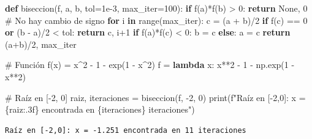 \documentclass[
  english,
  letterpaper,
  DIV=11,
  numbers=noendperiod]{scrartcl}
\newenvironment{Shaded}{\begin{snugshade}}{\end{snugshade}}
\newcommand{\BuiltInTok}[1]{\textcolor[rgb]{0.00,0.23,0.31}{#1}}
\newcommand{\CommentTok}[1]{\textcolor[rgb]{0.37,0.37,0.37}{#1}}
\newcommand{\ControlFlowTok}[1]{\textcolor[rgb]{0.00,0.23,0.31}{\textbf{#1}}}
\newcommand{\DecValTok}[1]{\textcolor[rgb]{0.68,0.00,0.00}{#1}}
\newcommand{\FloatTok}[1]{\textcolor[rgb]{0.68,0.00,0.00}{#1}}
\newcommand{\KeywordTok}[1]{\textcolor[rgb]{0.00,0.23,0.31}{\textbf{#1}}}
\newcommand{\NormalTok}[1]{\textcolor[rgb]{0.00,0.23,0.31}{#1}}
\newcommand{\OperatorTok}[1]{\textcolor[rgb]{0.37,0.37,0.37}{#1}}
\newcommand{\SpecialCharTok}[1]{\textcolor[rgb]{0.37,0.37,0.37}{#1}}
\newcommand{\SpecialStringTok}[1]{\textcolor[rgb]{0.13,0.47,0.30}{#1}}
\newcommand{\VariableTok}[1]{\textcolor[rgb]{0.07,0.07,0.07}{#1}}
\begin{document}
\begin{Shaded}
\begin{Highlighting}[]
\KeywordTok{def}\NormalTok{ biseccion(f, a, b, tol}\OperatorTok{=}\FloatTok{1e{-}3}\NormalTok{, max\_iter}\OperatorTok{=}\DecValTok{100}\NormalTok{):}
    \ControlFlowTok{if}\NormalTok{ f(a)}\OperatorTok{*}\NormalTok{f(b) }\OperatorTok{\textgreater{}} \DecValTok{0}\NormalTok{:}
        \ControlFlowTok{return} \VariableTok{None}\NormalTok{, }\DecValTok{0}  \CommentTok{\# No hay cambio de signo}
    \ControlFlowTok{for}\NormalTok{ i }\KeywordTok{in} \BuiltInTok{range}\NormalTok{(max\_iter):}
\NormalTok{        c }\OperatorTok{=}\NormalTok{ (a }\OperatorTok{+}\NormalTok{ b)}\OperatorTok{/}\DecValTok{2}
        \ControlFlowTok{if}\NormalTok{ f(c) }\OperatorTok{==} \DecValTok{0} \KeywordTok{or}\NormalTok{ (b }\OperatorTok{{-}}\NormalTok{ a)}\OperatorTok{/}\DecValTok{2} \OperatorTok{\textless{}}\NormalTok{ tol:}
            \ControlFlowTok{return}\NormalTok{ c, i}\OperatorTok{+}\DecValTok{1}
        \ControlFlowTok{if}\NormalTok{ f(a)}\OperatorTok{*}\NormalTok{f(c) }\OperatorTok{\textless{}} \DecValTok{0}\NormalTok{:}
\NormalTok{            b }\OperatorTok{=}\NormalTok{ c}
        \ControlFlowTok{else}\NormalTok{:}
\NormalTok{            a }\OperatorTok{=}\NormalTok{ c}
    \ControlFlowTok{return}\NormalTok{ (a}\OperatorTok{+}\NormalTok{b)}\OperatorTok{/}\DecValTok{2}\NormalTok{, max\_iter}

\CommentTok{\# Función f(x) = x\^{}2 {-} 1 {-} exp(1 {-} x\^{}2)}
\NormalTok{f }\OperatorTok{=} \KeywordTok{lambda}\NormalTok{ x: x}\OperatorTok{**}\DecValTok{2} \OperatorTok{{-}} \DecValTok{1} \OperatorTok{{-}}\NormalTok{ np.exp(}\DecValTok{1} \OperatorTok{{-}}\NormalTok{ x}\OperatorTok{**}\DecValTok{2}\NormalTok{)}

\CommentTok{\# Raíz en [{-}2, 0]}
\NormalTok{raiz, iteraciones }\OperatorTok{=}\NormalTok{ biseccion(f, }\OperatorTok{{-}}\DecValTok{2}\NormalTok{, }\DecValTok{0}\NormalTok{)}
\BuiltInTok{print}\NormalTok{(}\SpecialStringTok{f"Raíz en [{-}2,0]: x = }\SpecialCharTok{\{}\NormalTok{raiz}\SpecialCharTok{:.3f\}}\SpecialStringTok{ encontrada en }\SpecialCharTok{\{}\NormalTok{iteraciones}\SpecialCharTok{\}}\SpecialStringTok{ iteraciones"}\NormalTok{)}
\end{Highlighting}
\end{Shaded}

\begin{verbatim}
Raíz en [-2,0]: x = -1.251 encontrada en 11 iteraciones
\end{verbatim}
\end{document}
